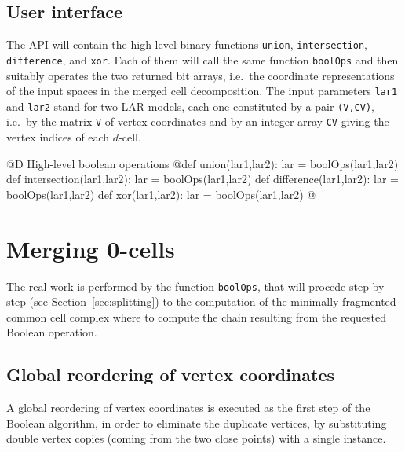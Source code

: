 \documentclass[11pt,oneside]{article}	%
\begin{document}
\subsection{User interface}

The API will contain the high-level binary functions \texttt{union}, \texttt{intersection}, \texttt{difference}, and \texttt{xor}. Each of them will call the same function \texttt{boolOps} and then suitably operates the two returned bit arrays, i.e.~the coordinate representations of the input spaces in the merged cell decomposition. The input parameters \texttt{lar1} and  \texttt{lar2} stand for two LAR models, each one constituted by a pair \texttt{(V,CV)}, i.e.~by the matrix \texttt{V} of vertex coordinates and by an integer array \texttt{CV} giving the vertex indices of each $d$-cell.

@D High-level boolean operations
@{def union(lar1,lar2):
	lar = boolOps(lar1,lar2)
def intersection(lar1,lar2):
	lar = boolOps(lar1,lar2)
def difference(lar1,lar2):
	lar = boolOps(lar1,lar2)
def xor(lar1,lar2):
	lar = boolOps(lar1,lar2)
@}

\section{Merging 0-cells}

The real work is performed by the function \texttt{boolOps}, that will procede step-by-step (see Section~\ref{sec:splitting}) to the computation of the minimally fragmented common cell complex where to compute the chain resulting from the requested Boolean operation.

\subsection{Global reordering of vertex coordinates}
A global reordering of vertex coordinates is executed as the first step of the Boolean algorithm, in order to eliminate the duplicate vertices, by substituting double vertex copies (coming from the two close points) with a single instance. 
\end{document}
